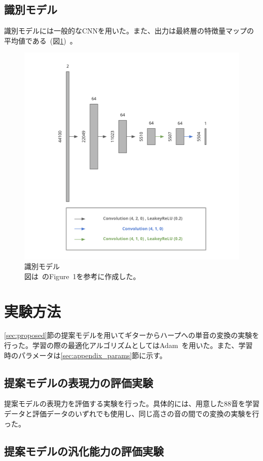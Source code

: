 
\subsection{識別モデル}

識別モデルには一般的なCNNを用いた。また、出力は最終層の特徴量マップの平均値である~(図\ref{fig:pr_dis})~。

\begin{figure}[b]
\begin{center}
\includegraphics[width=0.6\hsize]{figure/pr_discriminator.png}
\caption{識別モデル\\
図は~\cite{u-net}のFigure~1を参考に作成した。}
\label{fig:pr_dis}
\end{center}
\end{figure}

\section{実験方法}

\ref{sec:proposed}節の提案モデルを用いてギターからハープへの単音の変換の実験を行った。学習の際の最適化アルゴリズムとしてはAdam~\cite{Adam}を用いた。また、学習時のパラメータは\ref{sec:appendix_params}節に示す。

\subsection{提案モデルの表現力の評価実験}

提案モデルの表現力を評価する実験を行った。具体的には、用意した88音を学習データと評価データのいずれでも使用し、同じ高さの音の間での変換の実験を行った。

\subsection{提案モデルの汎化能力の評価実験}

